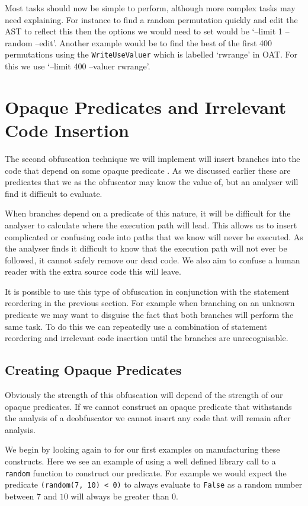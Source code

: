 \documentclass[twoside,a4paper]{report}
\begin{document}
Most tasks should now be simple to perform, although more complex tasks may need explaining. For instance to find a random permutation quickly and edit the
AST to reflect this then the options we would need to set would be `--limit 1 --random --edit'. Another example would be to find the best of the first 400
permutations using the \texttt{WriteUseValuer} which is labelled `rwrange' in OAT. For this we use `--limit 400 --valuer rwrange'.

\section{Opaque Predicates and Irrelevant Code Insertion}

The second obfuscation technique we will implement will insert branches into the code that depend on some opaque predicate \cite{taxobftrans}.
As we discussed earlier these are predicates that we as the obfuscator may know the value of, but an analyser will find it difficult to evaluate.

When branches depend on a predicate of this nature, it will be difficult for the analyser to calculate where the execution path will lead. This allows
us to insert complicated or confusing code into paths that we know will never be executed. As the analyser finds it difficult to know that the execution
path will not ever be followed, it cannot safely remove our dead code. We also aim to confuse a human reader with the extra source code this will leave.

It is possible to use this type of obfuscation in conjunction with the statement reordering in the previous section. For example when branching on
an unknown predicate we may want to disguise the fact that both branches will perform the same task. To do this we can repeatedly use a combination
of statement reordering and irrelevant code insertion until the branches are unrecognisable.

\subsection{Creating Opaque Predicates}

Obviously the strength of this obfuscation will depend of the strength of our opaque predicates. If we cannot construct an opaque predicate that withstands
the analysis of a deobfuscator we cannot insert any code that will remain after analysis.

We begin by looking again to \cite{taxobftrans} for our first examples on manufacturing these constructs. Here we see an example of using a well defined
library call to a \texttt{random} function to construct our predicate. For example we would expect the predicate \texttt{(random(7, 10) < 0)} to always
evaluate to \texttt{False} as a random number between $7$ and $10$ will always be greater than $0$.
\end{document}

